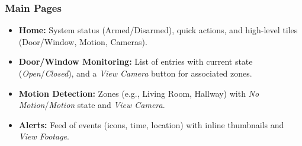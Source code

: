 \documentclass[conference]{IEEEtran}
\begin{document}
\subsubsection{Main Pages}
\begin{itemize}
  \item \textbf{Home:} System status (Armed/Disarmed), quick actions, and high-level tiles (Door/Window, Motion, Cameras).
  \item \textbf{Door/Window Monitoring:} List of entries with current state (\emph{Open}/\emph{Closed}), and a \emph{View Camera} button for associated zones.
  \item \textbf{Motion Detection:} Zones (e.g., Living Room, Hallway) with \emph{No Motion}/\emph{Motion} state and \emph{View Camera}.
  \item \textbf{Alerts:} Feed of events (icons, time, location) with inline thumbnails and \emph{View Footage}.
\end{itemize}

\FloatBarrier
\end{document}
